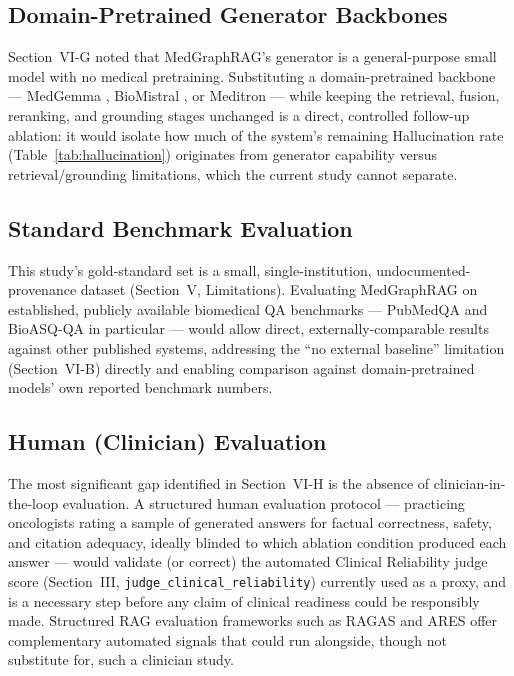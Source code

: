 \documentclass[conference]{IEEEtran}
\begin{document}
\subsection{Domain-Pretrained Generator Backbones}
Section~VI-G noted that MedGraphRAG's generator is a general-purpose small model with no medical pretraining. Substituting a domain-pretrained backbone --- MedGemma \cite{medgemma2025}, BioMistral \cite{labrak2024biomistral}, or Meditron \cite{chen2023meditron} --- while keeping the retrieval, fusion, reranking, and grounding stages unchanged is a direct, controlled follow-up ablation: it would isolate how much of the system's remaining Hallucination rate (Table~\ref{tab:hallucination}) originates from generator capability versus retrieval/grounding limitations, which the current study cannot separate.

\subsection{Standard Benchmark Evaluation}
This study's gold-standard set is a small, single-institution, undocumented-provenance dataset (Section~V, Limitations). Evaluating MedGraphRAG on established, publicly available biomedical QA benchmarks --- PubMedQA \cite{jin2019pubmedqa} and BioASQ-QA \cite{krithara2023bioasq} in particular --- would allow direct, externally-comparable results against other published systems, addressing the ``no external baseline'' limitation (Section~VI-B) directly and enabling comparison against domain-pretrained models' own reported benchmark numbers.

\subsection{Human (Clinician) Evaluation}
The most significant gap identified in Section~VI-H is the absence of clinician-in-the-loop evaluation. A structured human evaluation protocol --- practicing oncologists rating a sample of generated answers for factual correctness, safety, and citation adequacy, ideally blinded to which ablation condition produced each answer --- would validate (or correct) the automated Clinical Reliability judge score (Section~III, \texttt{judge\_clinical\_reliability}) currently used as a proxy, and is a necessary step before any claim of clinical readiness could be responsibly made. Structured RAG evaluation frameworks such as RAGAS \cite{es2024ragas} and ARES \cite{saadfalcon2024ares} offer complementary automated signals that could run alongside, though not substitute for, such a clinician study.
\end{document}
